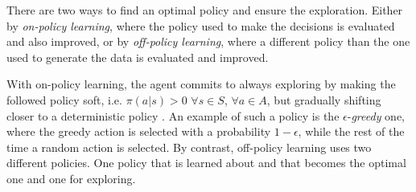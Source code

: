 There are two ways to find an optimal policy and ensure the exploration. Either by \textit{on-policy learning}, where the policy used to make the decisions is evaluated and also improved, or by \textit{off-policy learning}, where a different policy than the one used to generate the data is evaluated and improved.

With on-policy learning, the agent commits to always exploring by making the followed policy soft, i.e. $\pi(a|s) > 0$ $\forall s \in S$, $\forall a \in A$, but gradually shifting closer to a deterministic policy \cite[p.~100]{sutton_reinforcement_1998}. An example of such a policy is the $\epsilon$-\textit{greedy} one, where the greedy action is selected with a probability $1 - \epsilon$, while the rest of the time a random action is selected. By contrast, off-policy learning uses two different policies. One policy that is learned about and that becomes the optimal one and one for exploring. 



 
 
 

